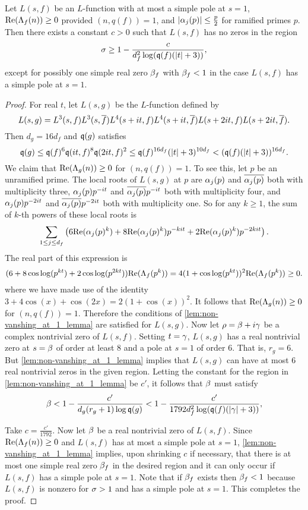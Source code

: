     \begin{theorem}\label{thm:zero_free_region_generic}
      Let $L(s,f)$ be an $L$-function with at most a simple pole at $s = 1$, $\mathrm{Re}(\Lambda_{f}(n)) \ge 0$ provided $(n,q(f)) = 1$, and $|\alpha_{j}(p)| \le \frac{p}{2}$ for ramified primes $p$. Then there exists a constant $c > 0$ such that $L(s,f)$ has no zeros in the region
      \[
        \sigma \ge 1-\frac{c}{d_{f}^{2}\log(\mathfrak{q}(f)(|t|+3))},
      \]
      except for possibly one simple real zero $\beta_{f}$ with $\beta_{f} < 1$ in the case $L(s,f)$ has a simple pole at $s = 1$.
    \end{theorem}
    \begin{proof}
      For real $t$, let $L(s,g)$ be the $L$-function defined by
      \[
        L(s,g) = L^{3}(s,f)L^{3}(s,\overline{f})L^{4}(s+it,f)L^{4}(s+it,\overline{f})L(s+2it,f)L(s+2it,\overline{f}).
      \]
      Then $d_{g} = 16d_{f}$ and $\mathfrak{q}(g)$ satisfies
      \[
        \mathfrak{q}(g) \le \mathfrak{q}(f)^{6}\mathfrak{q}(it,f)^{8}\mathfrak{q}(2it,f)^{2} \le \mathfrak{q}(f)^{16d_{f}}(|t|+3)^{10d_{f}} < (\mathfrak{q}(f)(|t|+3))^{16d_{f}}.
      \]
      We claim that $\mathrm{Re}(\Lambda_{g}(n)) \ge 0$ for $(n,q(f)) = 1$. To see this, let $p$ be an unramified prime. The local roots of $L(s,g)$ at $p$ are $\alpha_{j}(p)$ and $\overline{\alpha_{j}(p)}$ both with multiplicity three, $\alpha_{j}(p)p^{-it}$ and $\overline{\alpha_{j}(p)}p^{-it}$ both with multiplicity four, and $\alpha_{j}(p)p^{-2it}$ and $\overline{\alpha_{j}(p)}p^{-2it}$ both with multiplicity one. So for any $k \ge 1$, the sum of $k$-th powers of these local roots is
      \[
       \sum_{1 \le j \le d_{f}}\left(6\mathrm{Re}(\alpha_{j}(p)^{k})+8\mathrm{Re}(\alpha_{j}(p)^{k})p^{-kit}+2\mathrm{Re}(\alpha_{j}(p)^{k})p^{-2kit}\right).
      \]
      The real part of this expression is
      \[
         (6+8\cos\log(p^{kt})+2\cos\log(p^{2kt}))\mathrm{Re}(\Lambda_{f}(p^{k})) = 4(1+\cos\log(p^{kt}))^{2}\mathrm{Re}(\Lambda_{f}(p^{k})) \ge 0.
      \]
      where we have made use of the identity $3+4\cos(x)+\cos(2x) = 2(1+\cos(x))^{2}$. It follows that $\mathrm{Re}(\Lambda_{g}(n)) \ge 0$ for $(n,q(f)) = 1$. Therefore the conditions of \cref{lem:non-vanshing_at_1_lemma} are satisfied for $L(s,g)$. Now let $\rho = \beta+i\gamma$ be a complex nontrivial zero of $L(s,f)$. Setting $t = \gamma$, $L(s,g)$ has a real nontrivial zero at $s = \beta$ of order at least $8$ and a pole at $s = 1$ of order $6$. That is, $r_{g} = 6$. But \cref{lem:non-vanshing_at_1_lemma} implies that $L(s,g)$ can have at most $6$ real nontrivial zeros in the given region. Letting the constant for the region in \cref{lem:non-vanshing_at_1_lemma} be $c'$, it follows that $\beta$ must satisfy
      \[
        \beta < 1-\frac{c'}{d_{g}(r_{g}+1)\log{\mathfrak{q}(g)}} < 1-\frac{c'}{1792d_{f}^{2}\log(\mathfrak{q}(f)(|\gamma|+3))},
      \]
  
      Take $c = \frac{c'}{1792}$. Now let $\beta$ be a real nontrivial zero of $L(s,f)$. Since $\mathrm{Re}(\Lambda_{f}(n)) \ge 0$ and $L(s,f)$ has at most a simple pole at $s = 1$, \cref{lem:non-vanshing_at_1_lemma} implies, upon shrinking $c$ if necessary, that there is at most one simple real zero $\beta_{f}$ in the desired region and it can only occur if $L(s,f)$ has a simple pole at $s = 1$. Note that if $\beta_{f}$ exists then $\beta_{f} < 1$ because $L(s,f)$ is nonzero for $\sigma > 1$ and has a simple pole at $s = 1$. This completes the proof.
    \end{proof}
    
